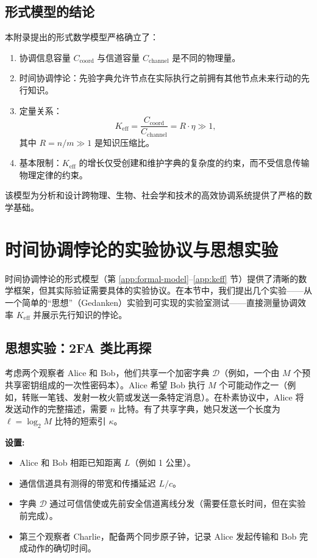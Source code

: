 \documentclass[12pt]{article}
\begin{document}
	\subsection{形式模型的结论}
	
	本附录提出的形式数学模型严格确立了：
	
	\begin{enumerate}
		\item 协调信息容量 $C_{\text{coord}}$ 与信道容量 $C_{\text{channel}}$ 是不同的物理量。
		
		\item 时间协调悖论：先验字典允许节点在实际执行之前拥有其他节点未来行动的先行知识。
		
		\item 定量关系：
		\[
		K_{\mathrm{eff}} = \frac{C_{\text{coord}}}{C_{\text{channel}}} = R \cdot \eta \gg 1,
		\]
		其中 $R = n/m \gg 1$ 是知识压缩比。
		
		\item 基本限制：$K_{\mathrm{eff}}$ 的增长仅受创建和维护字典的复杂度的约束，而不受信息传输物理定律的约束。
	\end{enumerate}
	
	该模型为分析和设计跨物理、生物、社会学和技术的高效协调系统提供了严格的数学基础。
	
	
	\section{时间协调悖论的实验协议与思想实验}
	\label{app:experimental-protocols}
	
	时间协调悖论的形式模型（第 \ref{app:formal-model}--\ref{app:keff} 节）提供了清晰的数学框架，但其实际验证需要具体的实验协议。在本节中，我们提出几个实验——从一个简单的“思想”（Gedanken）实验到可实现的实验室测试——直接测量协调效率 \(K_{\mathrm{eff}}\) 并展示先行知识的悖论。
	
	\subsection{思想实验：2FA 类比再探}
	\label{subsec:thought-2fa}
	
	考虑两个观察者 Alice 和 Bob，他们共享一个加密字典 \( \mathcal{D} \)（例如，一个由 \(M\) 个预共享密钥组成的一次性密码本）。Alice 希望 Bob 执行 \(M\) 个可能动作之一（例如，转账一笔钱、发射一枚火箭或发送一条特定消息）。在朴素协议中，Alice 将发送动作的完整描述，需要 \(n\) 比特。有了共享字典，她只发送一个长度为 \(\ell = \log_2 M\) 比特的短索引 \(\kappa\)。
	
	\textbf{设置:}
	\begin{itemize}
		\item Alice 和 Bob 相距已知距离 \(L\)（例如 1 公里）。
		\item 通信信道具有测得的带宽和传播延迟 \(L/c\)。
		\item 字典 \(\mathcal{D}\) 通过可信信使或先前安全信道离线分发（需要任意长时间，但在实验前完成）。
		\item 第三个观察者 Charlie，配备两个同步原子钟，记录 Alice 发起传输和 Bob 完成动作的确切时间。
	\end{itemize}
	
\end{document}
